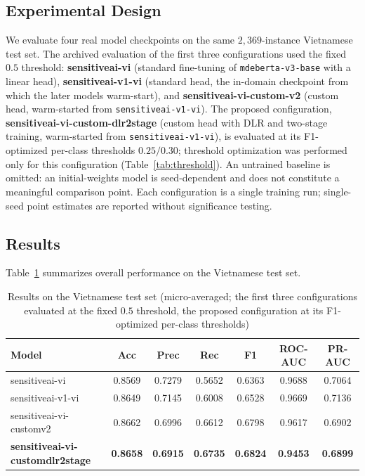 \documentclass[runningheads]{llncs}
\begin{document}
\subsection{Experimental Design}

We evaluate four real model checkpoints on the same $2{,}369$-instance Vietnamese test set. The archived evaluation of the first three configurations used the fixed $0.5$ threshold: \textbf{sensitiveai-vi} (standard fine-tuning of \texttt{mdeberta-v3-base} with a linear head), \textbf{sensitiveai-v1-vi} (standard head, the in-domain checkpoint from which the later models warm-start), and \textbf{sensitiveai-vi-custom-v2} (custom head, warm-started from \texttt{sensitiveai-v1-vi}). The proposed configuration, \textbf{sensitiveai-vi-custom-dlr2stage} (custom head with DLR and two-stage training, warm-started from \texttt{sensitiveai-v1-vi}), is evaluated at its F1-optimized per-class thresholds $0.25/0.30$; threshold optimization was performed only for this configuration (Table~\ref{tab:threshold}). An untrained baseline is omitted: an initial-weights model is seed-dependent and does not constitute a meaningful comparison point. Each configuration is a single training run; single-seed point estimates are reported without significance testing.

\subsection{Results}

Table~\ref{tab:results_vi} summarizes overall performance on the Vietnamese test set.

\begin{table}
\centering\footnotesize\setlength{\tabcolsep}{4pt}
\caption{Results on the Vietnamese test set (micro-averaged; the first three configurations evaluated at the fixed $0.5$ threshold, the proposed configuration at its F1-optimized per-class thresholds)}\label{tab:results_vi}
\begin{tabular}{@{}lcccccc@{}}
\hline
\textbf{Model} & \textbf{Acc} & \textbf{Prec} & \textbf{Rec} & \textbf{F1} & \textbf{ROC-AUC} & \textbf{PR-AUC} \\
\hline
sensitiveai-vi & 0.8569 & 0.7279 & 0.5652 & 0.6363 & 0.9688 & 0.7064 \\
sensitiveai-v1-vi & 0.8649 & 0.7145 & 0.6008 & 0.6528 & 0.9669 & 0.7136 \\
sensitiveai-vi-custom\newline v2 & 0.8662 & 0.6996 & 0.6612 & 0.6798 & 0.9617 & 0.6902 \\
\textbf{sensitiveai-vi-custom\newline dlr2stage} & \textbf{0.8658} & \textbf{0.6915} & \textbf{0.6735} & \textbf{0.6824} & \textbf{0.9453} & \textbf{0.6899} \\
\hline
\end{tabular}
\end{table}
\setlength{\tabcolsep}{6pt}
\end{document}
